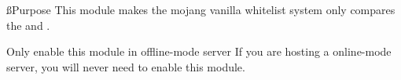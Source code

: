
\ss{Purpose}
This module makes the mojang vanilla whitelist system only compares the  and .

\begin{warn}{Only enable this module in offline-mode server}
    If you are hosting a online-mode server, you will never need to enable this module.
\end{warn}